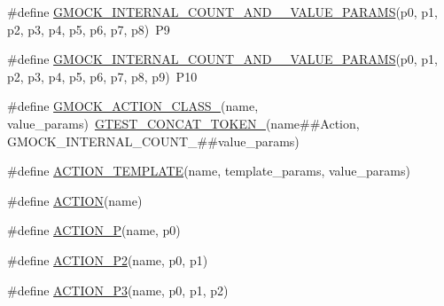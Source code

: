 \begin{DoxyCompactItemize}
\item 
\#define \mbox{\hyperlink{_obj__test_2lib_2googletest-release-1_88_81_2googlemock_2include_2gmock_2gmock-generated-actions_8h_a425b81bf1cdf7cd14d1e0184df9f204f}{G\+M\+O\+C\+K\+\_\+\+I\+N\+T\+E\+R\+N\+A\+L\+\_\+\+C\+O\+U\+N\+T\+\_\+\+A\+N\+D\+\_\+\_\+\+V\+A\+L\+U\+E\+\_\+\+P\+A\+R\+A\+MS}}(p0,  p1,  p2,  p3,  p4,  p5,  p6,  p7,  p8)~P9
\item 
\#define \mbox{\hyperlink{_obj__test_2lib_2googletest-release-1_88_81_2googlemock_2include_2gmock_2gmock-generated-actions_8h_abfe1adfe26341b5270a8d3385035c464}{G\+M\+O\+C\+K\+\_\+\+I\+N\+T\+E\+R\+N\+A\+L\+\_\+\+C\+O\+U\+N\+T\+\_\+\+A\+N\+D\+\_\+\_\+\+V\+A\+L\+U\+E\+\_\+\+P\+A\+R\+A\+MS}}(p0,  p1,  p2,  p3,  p4,  p5,  p6,  p7,  p8,  p9)~P10
\item 
\#define \mbox{\hyperlink{_obj__test_2lib_2googletest-release-1_88_81_2googlemock_2include_2gmock_2gmock-generated-actions_8h_af1442d2b3f80b5d04b409bca938fdcc5}{G\+M\+O\+C\+K\+\_\+\+A\+C\+T\+I\+O\+N\+\_\+\+C\+L\+A\+S\+S\+\_\+}}(name,  value\+\_\+params)~\mbox{\hyperlink{_obj__test_2lib_2googletest-release-1_88_81_2googletest_2include_2gtest_2internal_2gtest-internal_8h_ae3c336cbe1ae2bd1b1d019333e4428a0}{G\+T\+E\+S\+T\+\_\+\+C\+O\+N\+C\+A\+T\+\_\+\+T\+O\+K\+E\+N\+\_\+}}(name\#\#Action, G\+M\+O\+C\+K\+\_\+\+I\+N\+T\+E\+R\+N\+A\+L\+\_\+\+C\+O\+U\+N\+T\+\_\+\#\#value\+\_\+params)
\item 
\#define \mbox{\hyperlink{_obj__test_2lib_2googletest-release-1_88_81_2googlemock_2include_2gmock_2gmock-generated-actions_8h_ad04fa741f313f0c23924d61fcfb1536d}{A\+C\+T\+I\+O\+N\+\_\+\+T\+E\+M\+P\+L\+A\+TE}}(name,  template\+\_\+params,  value\+\_\+params)
\item 
\#define \mbox{\hyperlink{_obj__test_2lib_2googletest-release-1_88_81_2googlemock_2include_2gmock_2gmock-generated-actions_8h_a7af7137aa4871df4235881af377205fe}{A\+C\+T\+I\+ON}}(name)
\item 
\#define \mbox{\hyperlink{_obj__test_2lib_2googletest-release-1_88_81_2googlemock_2include_2gmock_2gmock-generated-actions_8h_a8ee9766f611f068271ca37a90c0e5960}{A\+C\+T\+I\+O\+N\+\_\+P}}(name,  p0)
\item 
\#define \mbox{\hyperlink{_obj__test_2lib_2googletest-release-1_88_81_2googlemock_2include_2gmock_2gmock-generated-actions_8h_a69fbf9ae696cc4cf779e22cb0960a067}{A\+C\+T\+I\+O\+N\+\_\+\+P2}}(name,  p0,  p1)
\item 
\#define \mbox{\hyperlink{_obj__test_2lib_2googletest-release-1_88_81_2googlemock_2include_2gmock_2gmock-generated-actions_8h_ab038de3f66ae709773473c18b6a43b29}{A\+C\+T\+I\+O\+N\+\_\+\+P3}}(name,  p0,  p1,  p2)

\end{DoxyCompactItemize}
